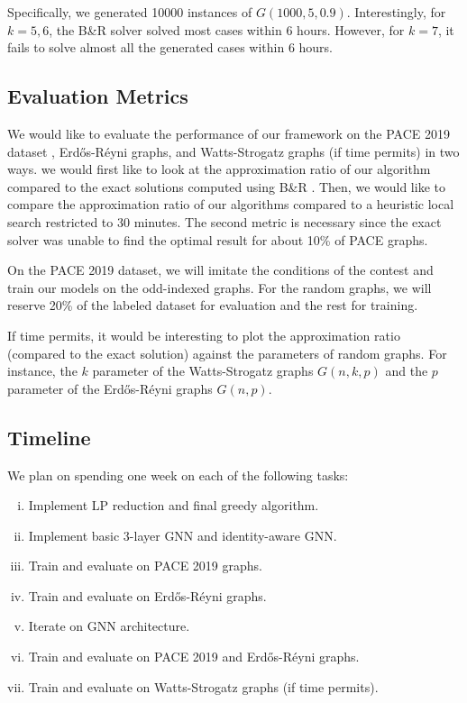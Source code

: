 \documentclass{article}
\begin{document}
Specifically,
we generated 10000 instances of $G(1000, 5, 0.9)$.
Interestingly, for $k=5,6$,
the B\&R solver solved most cases within 6 hours.
However, for $k=7$, it fails to solve almost all the generated cases within 6 hours.

\subsection{Evaluation Metrics}
We would like to evaluate the performance of our framework on the PACE 2019 dataset \citet{pace2019},
Erd\H os-R\'eyni graphs,
and Watts-Strogatz graphs (if time permits) in two ways.
we would first like to look at the approximation ratio of our algorithm compared to the exact solutions
computed using B\&R \citet{kamis}.
Then, we would like to compare the approximation ratio of our algorithms compared to a heuristic local search
restricted to 30 minutes.
The second metric is necessary since the exact solver was unable to find the optimal result for about 10\% of PACE graphs.

On the PACE 2019 dataset,
we will imitate the conditions of the contest and train our models on the odd-indexed graphs.
For the random graphs,
we will reserve 20\% of the labeled dataset for evaluation
and the rest for training.

If time permits,
it would be interesting to plot the approximation ratio (compared to the exact solution)
against the parameters of random graphs.
For instance, the $k$ parameter of the Watts-Strogatz graphs $G(n, k, p)$
and the $p$ parameter of the Erd\H os-R\'eyni graphs $G(n, p)$.

\subsection{Timeline}
We plan on spending one week on each of the following tasks:
\begin{enumerate}[(i)]
  \item Implement LP reduction and final greedy algorithm.
  \item Implement basic 3-layer GNN and identity-aware GNN.
  \item Train and evaluate on PACE 2019 graphs.
  \item Train and evaluate on Erd\H os-R\'eyni graphs.
  \item Iterate on GNN architecture.
  \item Train and evaluate on PACE 2019 and Erd\H os-R\'eyni graphs.
  \item Train and evaluate on Watts-Strogatz graphs (if time permits).
\end{enumerate}
\end{document}
